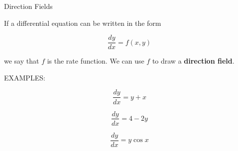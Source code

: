 \documentclass[11pt]{article}
\begin{document}
\begin{center}
\Large
\rm{Direction Fields}\\

\end{center}
\vspace{0.2in}

If a differential equation can be written in the form

\begin{displaymath}
  \frac{dy}{dx} = f(x,y)
\end{displaymath}

\vspace{0.1in}

we say that $f$ is the rate function.  We can use $f$ to draw a {\bf direction field}.\\

\vspace{0.3in}


EXAMPLES:


\begin{displaymath}
  \frac{dy}{dx} =  y + x
\end{displaymath}

\pagebreak



\begin{displaymath}
  \frac{dy}{dx} =  4-2y
\end{displaymath}
\vspace{1.in}

\vspace{3in}

\begin{displaymath}
  \frac{dy}{dx} =  y\cos{x}
\end{displaymath}
\vspace{1.in}
\end{document}
